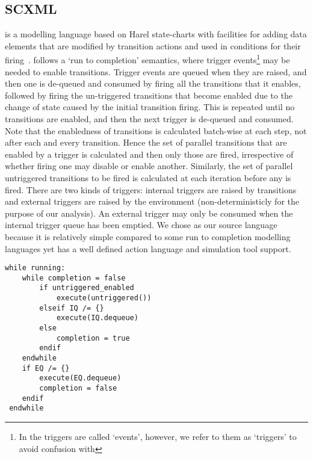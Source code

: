 
\subsection{SCXML}
\label{sec:scxml}

\SCXML is a modelling language based on Harel state-charts with facilities for adding data elements that are modified by transition actions and used in conditions for their firing~\cite{scxmlwebsite}. 
\SCXML follows a `run to completion' semantics, where trigger events\footnote{In \SCXML the triggers are called `events', however, we refer to them as `triggers' to avoid confusion with \EventB} may be needed to enable transitions.
Trigger events are queued when they are raised, and then one is de-queued and consumed by firing all the transitions that it enables, followed by firing the un-triggered transitions that become enabled due to the change of state caused by the initial transition firing.
This is repeated until no transitions are enabled, and then the next trigger is de-queued and consumed.
Note that the enabledness of transitions is calculated batch-wise at each step, not after each and every transition.
Hence the set of parallel transitions that are enabled by a trigger is calculated and then only those are fired, irrespective of whether firing one may disable or enable another.
Similarly, the set of parallel untriggered transitions to be fired is calculated at each iteration before any is fired.
There are two kinds of triggers: internal triggers are raised by transitions and external triggers are raised by the environment (non-deterministicly for the purpose of our analysis). 
An external trigger may only be consumed when the internal trigger queue has been emptied.
We chose \SCXML as our source language because it is relatively simple compared to some run to completion modelling languages yet has a well defined action language and simulation tool support.

\begin{lstlisting}[caption=Pseudocode for 'run to
  completion',label={lst:scxml-r2c}, frame=single, float=h,
  keywordstyle=\color{EventB@keywordcolour}\bfseries\sffamily,%
  keywords={while, if, elseif, else, endif, endwhile},
  ]
 while running:
 	while completion = false
 		if untriggered_enabled
 			execute(untriggered())
 		elseif IQ /= {}
 			execute(IQ.dequeue)
 		else
 			completion = true
 		endif
 	endwhile
 	if EQ /= {}
 		execute(EQ.dequeue) 
 		completion = false
 	endif
 endwhile 
\end{lstlisting}

